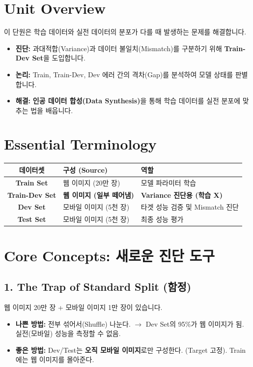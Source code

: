 \documentclass[11pt,a4paper]{book}
\theoremstyle{definition}
\begin{document}
\section{Unit Overview}
\begin{summarybox}[title={핵심 목표}]
이 단원은 학습 데이터와 실전 데이터의 분포가 다를 때 발생하는 문제를 해결합니다.
\begin{itemize}
    \item \textbf{진단:} 과대적합(Variance)과 데이터 불일치(Mismatch)를 구분하기 위해 \textbf{Train-Dev Set}을 도입합니다.
    \item \textbf{논리:} Train, Train-Dev, Dev 에러 간의 격차(Gap)를 분석하여 모델 상태를 판별합니다.
    \item \textbf{해결:} \textbf{인공 데이터 합성(Data Synthesis)}을 통해 학습 데이터를 실전 분포에 맞추는 법을 배웁니다.
\end{itemize}
\end{summarybox}

\section{Essential Terminology}
\begin{center}
\begin{tabular}{|c|l|l|}
\hline
\textbf{데이터셋} & \textbf{구성 (Source)} & \textbf{역할} \\ \hline
\textbf{Train Set} & 웹 이미지 (20만 장) & 모델 파라미터 학습 \\ \hline
\textbf{Train-Dev Set} & \textbf{웹 이미지 (일부 떼어냄)} & \textbf{Variance 진단용 (학습 X)} \\ \hline
\textbf{Dev Set} & 모바일 이미지 (5천 장) & 타겟 성능 검증 및 Mismatch 진단 \\ \hline
\textbf{Test Set} & 모바일 이미지 (5천 장) & 최종 성능 평가 \\ \hline
\end{tabular}
\end{center}

\section{Core Concepts: 새로운 진단 도구}

\subsection{1. The Trap of Standard Split (함정)}
웹 이미지 20만 장 + 모바일 이미지 1만 장이 있습니다.
\begin{itemize}
    \item \textbf{나쁜 방법:} 전부 섞어서(Shuffle) 나눈다. $\rightarrow$ Dev Set의 95\%가 웹 이미지가 됨. 실전(모바일) 성능을 측정할 수 없음.
    \item \textbf{좋은 방법:} Dev/Test는 \textbf{오직 모바일 이미지}로만 구성한다. (Target 고정). Train에는 웹 이미지를 몰아준다.
\end{itemize}
\end{document}
